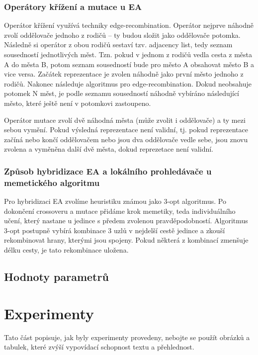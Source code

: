 \documentclass[journal]{IEEEtrancz}
\begin{document}
\subsubsection{Operátory křížení a mutace u EA}

Operátor křížení využívá techniky edge-recombination. Operátor nejprve
náhodně zvolí oddělovače jednoho z rodičů – ty budou složit jako oddělovače
potomka. Následně si operátor z obou rodičů sestaví tzv. adjacency list, tedy
seznam sousedností jednotlivých měst. Tzn. pokud v jednom z rodičů vedla cesta
z města A do města B, potom seznam sousedností bude pro město A obsahovat město B
a vice versa. Začátek reprezentace je zvolen náhodně jako první město jednoho z rodičů.
Nakonec následuje algoritmus pro edge-recombination. Dokud neobsahuje potomek N měst,
je podle seznamu sousedností náhodně vybíráno následující město, které ještě není v
potomkovi zastoupeno.


Operátor mutace zvolí dvě náhodná města (může zvolit i oddělovače) a ty
mezi sebou vymění. Pokud výsledná reprezentace není validní, tj. pokud reprezentace
začíná nebo končí oddělovačem nebo jsou dva oddělovače vedle sebe, jsou znovu zvolena
a vyměněna další dvě města, dokud reprezetace není validní.

\subsubsection{Způsob hybridizace EA a lokálního prohledávače u memetického algoritmu}

Pro hybridizaci EA zvolíme heuristiku známou jako 3-opt algoritmus. Po dokončení
crossoveru a mutace přidáme krok memetiky, teda individuálního učení, který nastane
u jedince s předem zvolenou pravděpodobností. Algoritmus 3-opt postupně vybírá kombinace
3 uzlů v nejdelší cestě jedince a zkouší rekombinovat hrany, kterými jsou spojeny. Pokud některá
z kombinací zmenšuje délku cesty, je tato rekombinace uložena.

\subsection{Hodnoty parametrů}



\section{Experimenty}
Tato část popisuje, jak byly experimenty provedeny, nebojte se použít obrázků a tabulek, které
zvýší vypovídací schopnost textu a přehlednost.
\end{document}
